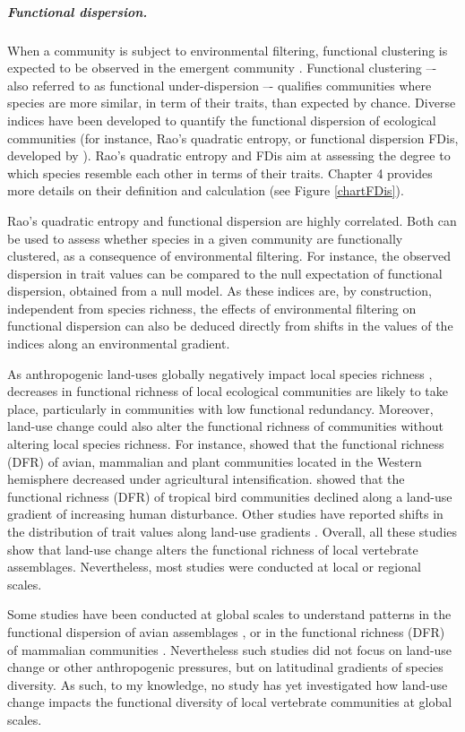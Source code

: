 \subparagraph{Functional dispersion.}
When a community is subject to environmental filtering, functional clustering is expected to be observed in the emergent community \citep{Wong2018, Cadotte2017}. Functional clustering –- also referred to as functional under-dispersion –- qualifies communities where species are more similar, in term of their traits, than expected by chance. Diverse indices have been developed to quantify the functional dispersion of ecological communities (for instance, Rao’s quadratic entropy, or functional dispersion FDis, developed by \citet{Laliberte2010}). Rao’s quadratic entropy and FDis aim at assessing the degree to which species resemble each other in terms of their traits. Chapter 4 provides more details on their definition and calculation (see Figure \ref{chartFDis}). 

Rao’s quadratic entropy and functional dispersion are highly correlated. Both can be used to assess whether species in a given community are functionally clustered, as a consequence of environmental filtering. For instance, the observed dispersion in trait values can be compared to the null expectation of functional dispersion, obtained from a null model. As these indices are, by construction, independent from species richness, the effects of environmental filtering on functional dispersion can also be deduced directly from shifts in the values of the indices along an environmental gradient. 

As anthropogenic land-uses globally negatively impact local species richness \citep{Newbold2015}, decreases in functional richness of local ecological communities are likely to take place, particularly in communities with low functional redundancy. Moreover, land-use change could also alter the functional richness of communities without altering local species richness. For instance, \citet{Flynn2009} showed that the functional richness (DFR) of avian, mammalian and plant communities located in the Western hemisphere decreased under agricultural intensification. \citet{Chapman2018} showed that the functional richness (DFR) of tropical bird communities declined along a land-use gradient of increasing human disturbance. Other studies have reported shifts in the distribution of trait values along land-use gradients \citep{LaSorte2018, Rapacciuolo2017}. Overall, all these studies show that land-use change alters the functional richness of local vertebrate assemblages. Nevertheless, most studies were conducted at local or regional scales.

Some studies have been conducted at global scales to understand patterns in the functional dispersion of avian assemblages \citep{Cooke2019}, or in the functional richness (DFR) of mammalian communities \citep{Safi2011}. Nevertheless such studies did not focus on land-use change or other anthropogenic pressures, but on latitudinal gradients of species diversity. As such, to my knowledge, no study has yet investigated how land-use change impacts the functional diversity of local vertebrate communities at global scales. 

